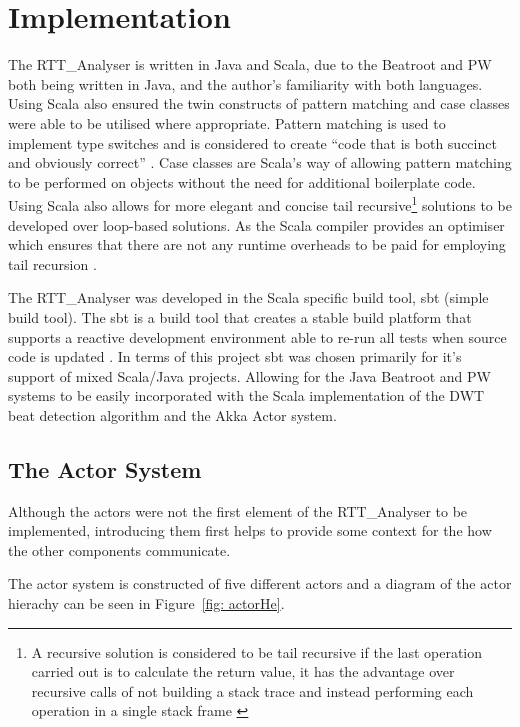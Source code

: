 \documentclass[a4paper, 11pt]{article}
\begin{document}
\maketitle{} \section{Implementation}
The RTT\_Analyser is written in Java and Scala, due to the Beatroot and PW both being written in Java, and the author's familiarity with both languages. Using Scala also ensured the twin constructs of pattern matching and case classes were able to be utilised where appropriate. Pattern matching is used to implement type switches and is considered to create ``code that is both succinct and obviously correct'' \cite{mariusEr}. Case classes are Scala's way of allowing pattern matching to be performed on objects without the need for additional boilerplate code. Using Scala also allows for more elegant and concise tail recursive\footnote{A recursive solution is considered to be tail recursive if the last operation carried out is to calculate the return value, it has the advantage over recursive calls of not building a stack trace and instead performing each operation in a single stack frame \cite{odesky}} solutions to be developed over loop-based solutions. As the Scala compiler provides an optimiser which ensures that there are not any runtime overheads to be paid for employing tail recursion \cite{odesky}.

The RTT\_Analyser was developed in the Scala specific build tool, sbt (simple build tool). The sbt is a build tool that creates a stable build platform that supports a reactive development environment able to re-run all tests when source code is updated \cite{sbt}. In terms of this project sbt was chosen primarily for it's support of mixed Scala/Java projects. Allowing for the Java Beatroot and PW systems to be easily incorporated with the Scala implementation of the DWT beat detection algorithm and the Akka Actor system.

\subsection{The Actor System}
Although the actors were not the first element of the RTT\_Analyser to be implemented, introducing them first helps to provide some context for the how the other components communicate.\par

The actor system is constructed of five different actors and a diagram of the actor hierachy can be seen in Figure~\ref{fig: actorHe}. 
\end{document}
